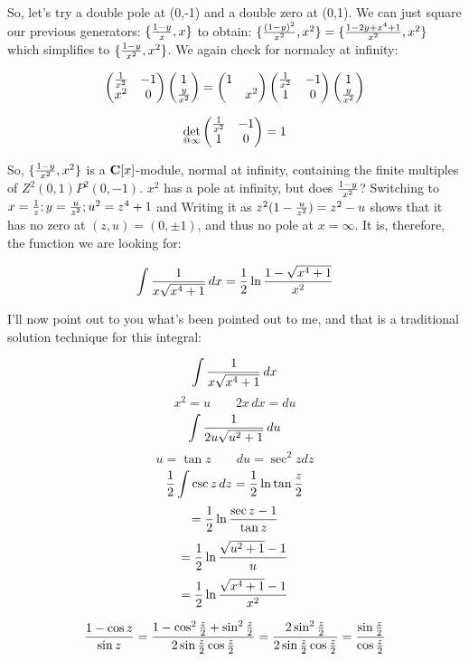 \vfill\eject

So, let's try a double pole at (0,-1) and a double zero at (0,1).  We
can just square our previous generators:
$\{ {{1-y}\over{x}}, x \} $
to obtain: 
$\{ {(1-y)^2\over{x^2}}, x^2 \} = \{ {{1-2y+x^4+1}\over{x^2}}, x^2 \}$
which simplifies to
$\{ {{1-y}\over{x^2}}, x^2 \}$.  We again check for normalcy
at infinity:

$$\begin{pmatrix}
{1\over{x^2}} & -1 \cr
x^2 & 0\end{pmatrix} \begin{pmatrix}1 \cr {y\over{x^2}}\end{pmatrix} = \begin{pmatrix}1 & \cr & x^2\end{pmatrix}\begin{pmatrix}
{1\over{x^2}} & -1 \cr
1 & 0\end{pmatrix}
\begin{pmatrix}1 \cr {y\over{x^2}}\end{pmatrix} $$

$$\det_{@\infty}\begin{pmatrix}
{1\over{x^2}} & -1 \cr
1 & 0\end{pmatrix} = 1$$

So, $\{{{1-y}\over{x^2}}, x^2\}$ is a ${\bf C}[x]$-module, normal at
infinity, containing the finite multiples of $Z^2(0,1)P^2(0,-1)$.
$x^2$ has a pole at infinity, but does ${1-y}\over{x^2}$?
Switching to $x={1\over z}; y={u\over{z^2}}; u^2 = z^4 + 1$ and
Writing it as $z^2(1-{u\over{z^2}}) = z^2 - u$ shows that it has no
zero at $(z,u) = (0, \pm 1)$, and thus no pole at $x = \infty$.  It
is, therefore, the function we are looking for:

$$\int {1\over{x\sqrt{x^4+1}}} \, dx
   = {1\over2} \ln{{1-\sqrt{x^4+1}}\over{x^2}}$$

I'll now point out to you what's been pointed out to me, and that is a
traditional solution technique for this integral:

$$\int {1\over{x\sqrt{x^4+1}}} \, dx$$
$$x^2 = u \qquad 2 x\, dx = du$$
$$\int {1\over{2u\sqrt{u^2+1}}} \, du$$
$$u = \tan z \qquad du = \sec^2 z dz$$
$${1 \over 2} \int \csc z \, dz = {1\over 2} \ln \tan {z\over2}$$
$$={1\over2} \ln {{\sec z - 1}\over{\tan z}}$$
$$={1\over2} \ln {{\sqrt{u^2+1}-1}\over{u}}$$
$$={1\over2} \ln {{\sqrt{x^4+1}-1}\over{x^2}}$$

\vskip 0.5in

$${{1 - \cos z}\over{\sin z}} = {{1 - \cos^2 {z\over2} + \sin^2 {z\over2}}\over{2\sin{z\over2}\cos{z\over2}}} = {{2\sin^2 {z\over2}}\over{2\sin{z\over2}\cos{z\over2}}} = {{\sin {z\over2}}\over{\cos{z\over2}}} $$

